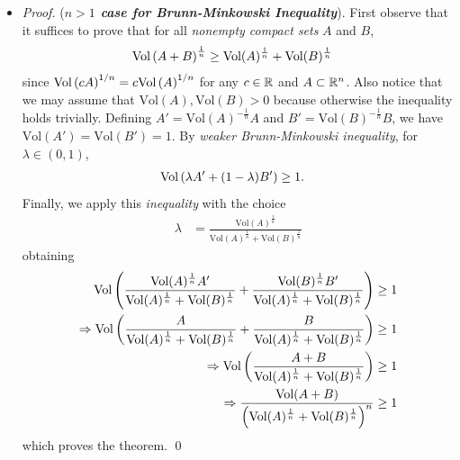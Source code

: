 \documentclass[11pt]{article}
\begin{document}
\begin{itemize}
\item \begin{proof}  (\textbf{\emph{$n> 1$ case for Brunn-Minkowski Inequality}}).  First observe that it suffices to prove that for all \emph{nonempty compact sets} $A$ and $B$,
\begin{align*}
\text{Vol}\left( A + B \right)^{\frac{1}{n}} &\ge \text{Vol}(A)^{\frac{1}{n}} + \text{Vol}(B)^{\frac{1}{n}}
\end{align*} since $\text{Vol}\left(c A\right)^{1/n} = c \text{Vol}\left(A\right)^{1/n}$ for any $c \in {\mathbb R}$ and $A \subset {\mathbb R}^n$. Also notice that we may assume that $ \text{Vol}(A),  \text{Vol}(B) > 0$ because otherwise the inequality holds trivially. Defining $A' = \text{Vol}(A)^{-\frac{1}{n}} A$ and $B' =  \text{Vol}(B)^{-\frac{1}{n}}B$, we have $ \text{Vol}(A') = \text{Vol}(B') = 1$. By \emph{weaker Brunn-Minkowski inequality}, for $\lambda \in (0, 1)$,
\begin{align*}
\text{Vol}\left( \lambda A' + (1- \lambda) B' \right) &\ge 1.
\end{align*} Finally, we apply this \emph{inequality} with the choice
\begin{align*}
\lambda &= \frac{\text{Vol}(A)^{\frac{1}{n}}}{\text{Vol}(A)^{\frac{1}{n}} + \text{Vol}(B)^{\frac{1}{n}}}
\end{align*} obtaining
\begin{align*}
\text{Vol}\left( \frac{\text{Vol}(A)^{\frac{1}{n}}A'}{\text{Vol}(A)^{\frac{1}{n}} + \text{Vol}(B)^{\frac{1}{n}}}  + \frac{\text{Vol}(B)^{\frac{1}{n}}B'}{\text{Vol}(A)^{\frac{1}{n}} + \text{Vol}(B)^{\frac{1}{n}}}  \right)  &\ge 1\\
\Rightarrow \text{Vol}\left( \frac{A}{\text{Vol}(A)^{\frac{1}{n}} + \text{Vol}(B)^{\frac{1}{n}}}  + \frac{B}{\text{Vol}(A)^{\frac{1}{n}} + \text{Vol}(B)^{\frac{1}{n}}}  \right)  &\ge 1 \\
\Rightarrow \text{Vol}\left( \frac{A + B}{\text{Vol}(A)^{\frac{1}{n}} + \text{Vol}(B)^{\frac{1}{n}}}    \right)  &\ge 1 \\
\Rightarrow \frac{\text{Vol}(A + B)}{\left(\text{Vol}(A)^{\frac{1}{n}} + \text{Vol}(B)^{\frac{1}{n}}\right)^n} &\ge 1 
\end{align*} which proves the theorem. \qed
\end{proof}
\end{itemize}
\end{document}

